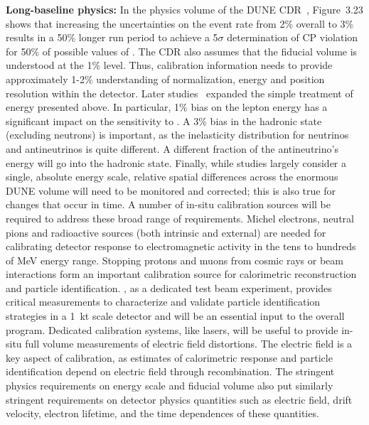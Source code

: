 \textbf{Long-baseline physics:} In the physics volume of the DUNE CDR~\cite{Acciarri:2015uup}, Figure~3.23 shows that increasing the uncertainties on the \nue event rate from \num{2}\% overall 
to \num{3}\% results in a \num{50}\% longer run period to achieve a 5$\sigma$ determination of CP violation for 50\% of possible values of . The CDR also assumes that the fiducial volume is understood at the 1\% level. Thus, calibration information needs to provide approximately 1-2\% understanding of normalization, energy and position resolution within the detector. Later studies~\cite{ebias} expanded the simple treatment of energy  presented above. In particular, \num{1}\% bias on the lepton energy has a significant impact on the sensitivity to . 
A \num{3}\% bias in the hadronic state (excluding neutrons) is important, as the inelasticity  distribution for neutrinos and antineutrinos is quite different.  A different fraction of the antineutrino's energy will go into the hadronic state. Finally, while studies largely consider a single, absolute energy scale, relative spatial differences across the enormous DUNE  volume will need to be monitored and corrected; this is also true for changes that occur in time. A number of in-situ calibration sources will be required to address these broad range of requirements. Michel electrons, neutral pions and radioactive sources (both intrinsic and external) are needed for calibrating detector response to electromagnetic activity in the tens to hundreds of MeV energy range. Stopping protons and muons from cosmic rays or beam interactions form an important calibration source for calorimetric reconstruction and particle identification. , as a dedicated test beam experiment, provides critical measurements to characterize and validate particle identification strategies in a 1~kt scale detector and will be an essential input to the overall program. Dedicated calibration systems, like lasers, will be useful to provide in-situ full volume measurements of electric field distortions. The electric field is a key aspect of calibration, as  estimates of calorimetric response and particle identification depend on electric field through recombination. The stringent physics requirements on energy scale and fiducial volume also put similarly stringent requirements on detector physics quantities such as electric field, drift velocity, electron lifetime, and the time dependences of these quantities.

